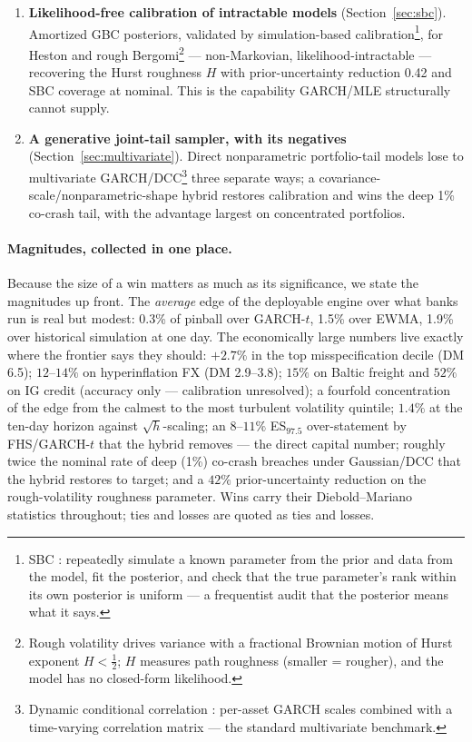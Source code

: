 \documentclass[11pt]{article}
\theoremstyle{remark}
\begin{document}
\begin{enumerate}[leftmargin=1.6em]
diagnosis --- not any particular posterior --- is what carries the
chapter.
\item \textbf{Likelihood-free calibration of intractable models}
(Section~\ref{sec:sbc}). Amortized GBC posteriors, validated by
simulation-based calibration\footnote{SBC \citep{talts2018sbc}:
repeatedly simulate a known parameter from the prior and data from the
model, fit the posterior, and check that the true parameter's rank
within its own posterior is uniform --- a frequentist audit that the
posterior means what it says.}, for Heston and rough
Bergomi\footnote{Rough volatility \citep{gatheral2018roughvol} drives
variance with a fractional Brownian motion of Hurst exponent
$H<\tfrac12$; $H$ measures path roughness (smaller = rougher), and the
model has no closed-form likelihood.} ---
non-Markovian, likelihood-intractable --- recovering the Hurst roughness
$H$ with prior-uncertainty reduction 0.42 and SBC coverage at nominal.
This is the capability GARCH/MLE structurally cannot supply.
\item \textbf{A generative joint-tail sampler, with its negatives}
(Section~\ref{sec:multivariate}). Direct nonparametric portfolio-tail
models lose to multivariate GARCH/DCC\footnote{Dynamic conditional
correlation \citep{engle2002dcc}: per-asset GARCH scales combined with a
time-varying correlation matrix --- the standard multivariate
benchmark.} three separate ways; a
covariance-scale/nonparametric-shape hybrid restores calibration and
wins the deep 1\% co-crash tail, with the advantage largest on
concentrated portfolios.
\end{enumerate}

\paragraph{Magnitudes, collected in one place.} Because the size of a
win matters as much as its significance, we state the magnitudes up
front. The \emph{average} edge of the deployable engine over what banks
run is real but modest: 0.3\% of pinball over GARCH-$t$, 1.5\% over
EWMA, 1.9\% over historical simulation at one day. The economically
large numbers live exactly where the frontier says they should:
$+2.7\%$ in the top misspecification decile (DM 6.5); $12$--$14\%$ on
hyperinflation FX (DM 2.9--3.8); $15\%$ on Baltic freight and $52\%$ on
IG credit (accuracy only --- calibration unresolved); a fourfold
concentration of the edge from the calmest to the most turbulent
volatility quintile; $1.4\%$ at the ten-day horizon against
$\sqrt{h}$-scaling; an $8$--$11\%$ ES$_{97.5}$ over-statement by
FHS/GARCH-$t$ that the hybrid removes --- the direct capital number;
roughly twice the nominal rate of deep (1\%) co-crash breaches under
Gaussian/DCC that the hybrid restores to target; and a $42\%$
prior-uncertainty reduction on the rough-volatility roughness parameter.
Wins carry their Diebold--Mariano statistics throughout; ties and losses
are quoted as ties and losses.
\end{document}
